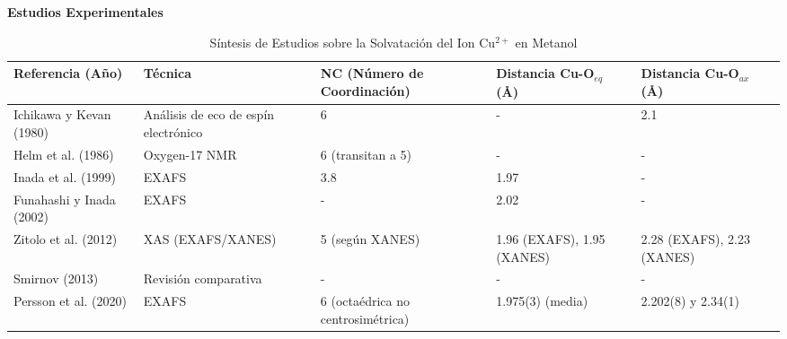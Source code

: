 \begin{sidewaystable}
    \centering
    \caption{Síntesis de Estudios sobre la Solvatación del Ion Cu$^{2+}$ en Metanol}
    \label{tab:metanol_corrected}
    {\scriptsize %
    
    \textbf{Estudios Experimentales}
    \vspace{2mm} %
    
    \begin{tabular}{@{}lllll@{}}
    \toprule
    \textbf{Referencia (Año)} & \textbf{Técnica} & \textbf{NC (Número de Coordinación)} & \textbf{Distancia Cu-O$_{eq}$ (\AA)} & \textbf{Distancia Cu-O$_{ax}$ (\AA)} \\
    \midrule
    Ichikawa y Kevan (1980)   & Análisis de eco de espín electrónico & 6                                         & -                                 & 2.1                                    \\
    Helm et al. (1986)        & Oxygen-17 NMR                        & 6 (transitan a 5)                         & -                                & -                                      \\
    Inada et al. (1999)       & EXAFS                                & 3.8                                      & 1.97                             & -                                     \\
    Funahashi y Inada (2002)  & EXAFS                                & -                                        & 2.02                             & -                                     \\
    Zitolo et al. (2012)      & XAS (EXAFS/XANES)                    & 5 (según XANES)                          & 1.96 (EXAFS), 1.95 (XANES)  & 2.28 (EXAFS), 2.23 (XANES)   \\
    Smirnov (2013)            & Revisión comparativa                 & -                                        & -                                & -                                     \\
    Persson et al. (2020)     & EXAFS                                & 6 (octaédrica no centrosimétrica)      & 1.975(3) (media)                 & 2.202(8) y 2.34(1)                \\
    \bottomrule
    \end{tabular}

    \vspace{8mm} %

}
\end{sidewaystable}
